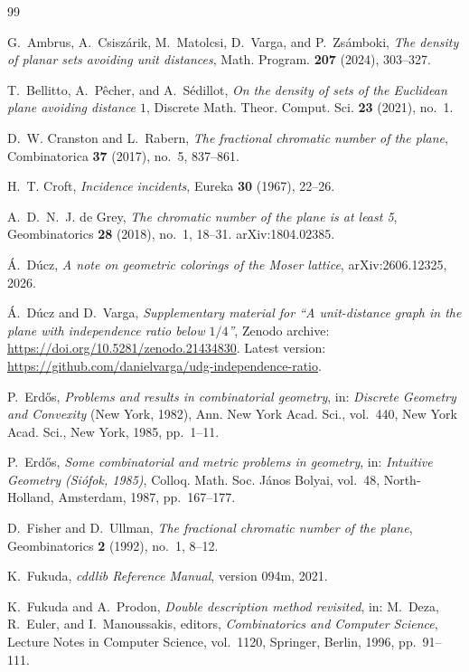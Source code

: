 \documentclass[pdflatex,sn-mathphys-num]{sn-jnl}%
\begin{document}
\begin{thebibliography}{99}

G.~Ambrus, A.~Csisz{\'a}rik, M.~Matolcsi, D.~Varga, and P.~Zs{\'a}mboki,
\emph{The density of planar sets avoiding unit distances},
Math. Program. \textbf{207} (2024), 303--327.

T.~Bellitto, A.~P{\^e}cher, and A.~S{\'e}dillot,
\emph{On the density of sets of the Euclidean plane avoiding distance $1$},
Discrete Math. Theor. Comput. Sci. \textbf{23} (2021), no.~1.

D.~W. Cranston and L.~Rabern,
\emph{The fractional chromatic number of the plane},
Combinatorica \textbf{37} (2017), no.~5, 837--861.

H.~T. Croft,
\emph{Incidence incidents},
Eureka \textbf{30} (1967), 22--26.

A.~D.~N.~J. de Grey,
\emph{The chromatic number of the plane is at least 5},
Geombinatorics \textbf{28} (2018), no.~1, 18--31.
arXiv:1804.02385.

\'{A}.~D\'ucz,
\emph{A note on geometric colorings of the Moser lattice},
arXiv:2606.12325, 2026.

\'{A}.~D\'ucz and D.~Varga,
\emph{Supplementary material for ``A unit-distance graph in the plane with independence ratio below $1/4$''},
Zenodo archive: \url{https://doi.org/10.5281/zenodo.21434830}.
Latest version: \url{https://github.com/danielvarga/udg-independence-ratio}.

P.~Erd{\H{o}}s,
\emph{Problems and results in combinatorial geometry},
in: \emph{Discrete Geometry and Convexity} (New York, 1982),
Ann. New York Acad. Sci., vol.~440,
New York Acad. Sci., New York, 1985, pp.~1--11.

P.~Erd{\H{o}}s,
\emph{Some combinatorial and metric problems in geometry},
in: \emph{Intuitive Geometry (Si{\'o}fok, 1985)},
Colloq. Math. Soc. J{\'a}nos Bolyai, vol.~48,
North-Holland, Amsterdam, 1987, pp.~167--177.

D.~Fisher and D.~Ullman,
\emph{The fractional chromatic number of the plane},
Geombinatorics \textbf{2} (1992), no.~1, 8--12.

K.~Fukuda,
\emph{cddlib Reference Manual},
version 094m, 2021.

K.~Fukuda and A.~Prodon,
\emph{Double description method revisited},
in: M.~Deza, R.~Euler, and I.~Manoussakis, editors,
\emph{Combinatorics and Computer Science},
Lecture Notes in Computer Science, vol.~1120,
Springer, Berlin, 1996, pp.~91--111.


\end{thebibliography}
\end{document}
